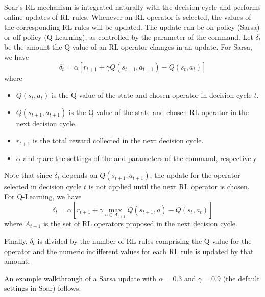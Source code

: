 Soar's RL mechanism is integrated naturally with the decision cycle and performs online updates of RL rules.
Whenever an RL operator is selected, the values of the corresponding RL rules will be updated.
The update can be on-policy (Sarsa) or off-policy (Q-Learning), as controlled by the  parameter of the  command.
Let $\delta_t$ be the amount the Q-value of an RL operator changes in an update.
For Sarsa, we have
$$ \delta_t = \alpha \left[ r_{t+1} + \gamma Q(s_{t+1}, a_{t+1}) - Q(s_t, a_t) \right] $$
where 
\begin{itemize}
\item $Q(s_t, a_t)$ is the Q-value of the state and chosen operator in decision cycle $t$.
\item $Q(s_{t+1}, a_{t+1})$ is the Q-value of the state and chosen RL operator in the next decision cycle.
\item $r_{t+1}$ is the total reward collected in the next decision cycle.
\item $\alpha$ and $\gamma$ are the settings of the  and  parameters of the  command, respectively.
\end{itemize}

Note that since $\delta_t$ depends on $Q(s_{t+1}, a_{t+1})$, the update for the operator selected in decision cycle $t$ is not applied until the next RL operator is chosen.
For Q-Learning, we have
$$ \delta_t = \alpha \left[ r_{t+1} + \gamma \underset{a \in A_{t+1}}{\max} Q(s_{t+1}, a) - Q(s_t, a_t) \right] $$
where $A_{t+1}$ is the set of RL operators proposed in the next decision cycle.

Finally, $\delta_t$ is divided by the number of RL rules comprising the Q-value for the operator and the numeric indifferent values for each RL rule is updated by that amount.

An example walkthrough of a Sarsa update with $\alpha = 0.3$ and $\gamma = 0.9$ (the default settings in Soar) follows.

